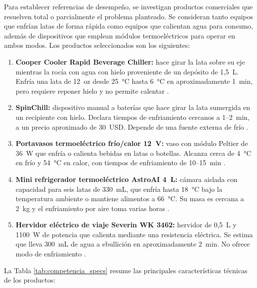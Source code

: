 \documentclass[12pt, a4paper]{article}
\begin{document}
Para establecer referencias de desempeño, se investigan productos comerciales que resuelven total o parcialmente el problema planteado. Se consideran tanto equipos que enfrían latas de forma rápida como equipos que calientan agua para consumo, además de dispositivos que emplean módulos termoeléctricos para operar en ambos modos. Los productos seleccionados son los siguientes:

\begin{enumerate}
    \item \textbf{Cooper Cooler Rapid Beverage Chiller:} hace girar la lata sobre su eje mientras la rocía con agua con hielo proveniente de un depósito de 1,5~L. Enfría una lata de 12~oz desde \SI{25}{\celsius} hasta \SI{6}{\celsius} en aproximadamente 1~min, pero requiere reponer hielo y no permite calentar \parencite{drinkstuff_cooper}.
    \item \textbf{SpinChill:} dispositivo manual a baterías que hace girar la lata sumergida en un recipiente con hielo. Declara tiempos de enfriamiento cercanos a 1--2~min, a un precio aproximado de 30~USD. Depende de una fuente externa de frío \parencite{reviewed_spinchill, themanual_spinchill}.
    \item \textbf{Portavasos termoeléctrico frío/calor 12~V:} vaso con módulo Peltier de \SI{36}{\watt} que enfría o calienta bebidas en latas o botellas. Alcanza cerca de \SI{4}{\celsius} en frío y \SI{54}{\celsius} en calor, con tiempos de enfriamiento de 10--15~min \parencite{ottocast_cup, rvtravel_cup}.
    \item \textbf{Mini refrigerador termoeléctrico AstroAI 4~L:} cámara aislada con capacidad para seis latas de 330~mL, que enfría hasta \SI{18}{\celsius} bajo la temperatura ambiente o mantiene alimentos a \SI{66}{\celsius}. Su masa es cercana a 2~kg y el enfriamiento por aire toma varias horas \parencite{astroai_fridge}.
    \item \textbf{Hervidor eléctrico de viaje Severin WK 3462:} hervidor de 0,5~L y \SI{1100}{\watt} de potencia que calienta mediante una resistencia eléctrica. Se estima que lleva 300~mL de agua a ebullición en aproximadamente 2~min. No ofrece modo de enfriamiento \parencite{severin_wk3462}.
\end{enumerate}

La Tabla \ref{tab:competencia_specs} resume las principales características técnicas de los productos:
\end{document}
